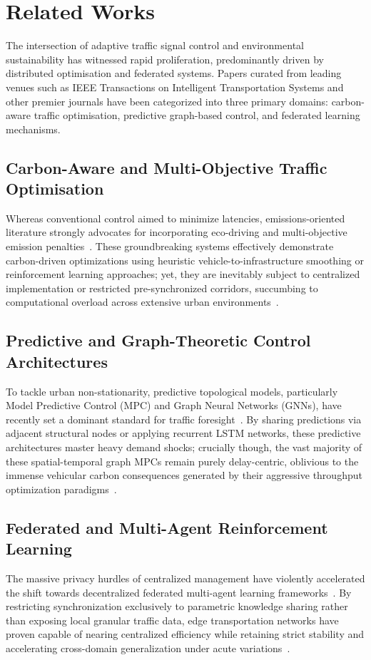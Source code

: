 \documentclass[journal]{IEEEtran}
\begin{document}
\section{Related Works}
\label{sec:related}

The intersection of adaptive traffic signal control and environmental sustainability has witnessed rapid proliferation, predominantly driven by distributed optimisation and federated systems. Papers curated from leading venues such as IEEE Transactions on Intelligent Transportation Systems and other premier journals have been categorized into three primary domains: carbon-aware traffic optimisation, predictive graph-based control, and federated learning mechanisms.

\subsection{Carbon-Aware and Multi-Objective Traffic Optimisation}
Whereas conventional control aimed to minimize latencies, emissions-oriented literature strongly advocates for incorporating eco-driving and multi-objective emission penalties~\cite{Patel2024_tits, Kim2025_tits, Wang2024_tvt, Wu2025_tits}. These groundbreaking systems effectively demonstrate carbon-driven optimizations using heuristic vehicle-to-infrastructure smoothing or reinforcement learning approaches; yet, they are inevitably subject to centralized implementation or restricted pre-synchronized corridors, succumbing to computational overload across extensive urban environments~\cite{Lee2026_tits, Chen2024_tiv}.

\subsection{Predictive and Graph-Theoretic Control Architectures}
To tackle urban non-stationarity, predictive topological models, particularly Model Predictive Control (MPC) and Graph Neural Networks (GNNs), have recently set a dominant standard for traffic foresight~\cite{singleMPC, stcl, Zhang2025_tits, Zhao2024_tits}. By sharing predictions via adjacent structural nodes or applying recurrent LSTM networks, these predictive architectures master heavy demand shocks; crucially though, the vast majority of these spatial-temporal graph MPCs remain purely delay-centric, oblivious to the immense vehicular carbon consequences generated by their aggressive throughput optimization paradigms~\cite{Singh2026_tits, Kumar2025_tits}.

\subsection{Federated and Multi-Agent Reinforcement Learning}
The massive privacy hurdles of centralized management have violently accelerated the shift towards decentralized federated multi-agent learning frameworks~\cite{clusteredFL, positionFL, Ma2024_tits}. By restricting synchronization exclusively to parametric knowledge sharing rather than exposing local granular traffic data, edge transportation networks have proven capable of nearing centralized efficiency while retaining strict stability and accelerating cross-domain generalization under acute variations~\cite{Yang2025_tits, Li2026_tiv}.
\end{document}
